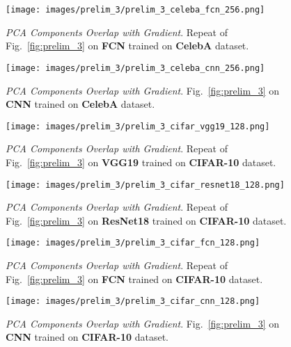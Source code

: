\begin{figure}[h!]
  \centering
  \centerline{\texttt{[image: images/prelim\_3/prelim\_3\_celeba\_fcn\_256.png]}}
  \caption{\small{\textit{PCA Components Overlap with Gradient}. Repeat of Fig.~\ref{fig:prelim_3} on \textbf{FCN} trained on \textbf{CelebA} dataset.}}
  \label{fig:prelim_3_celeba_fcn}
\end{figure}

\begin{figure}[h!]
  \centering
  \centerline{\texttt{[image: images/prelim\_3/prelim\_3\_celeba\_cnn\_256.png]}}
  \caption{\small{\textit{PCA Components Overlap with Gradient}. Fig.~\ref{fig:prelim_3} on \textbf{CNN} trained on \textbf{CelebA} dataset.}}
  \label{fig:prelim_3_celeba_cnn}
\end{figure}



\begin{figure}[h!]
  \centering
  \centerline{\texttt{[image: images/prelim\_3/prelim\_3\_cifar\_vgg19\_128.png]}}
  \caption{\small{\textit{PCA Components Overlap with Gradient}. Repeat of Fig.~\ref{fig:prelim_3} on \textbf{VGG19} trained on \textbf{CIFAR-10} dataset.}}
  \label{fig:prelim_3_cifar_vgg19}
\end{figure}

\begin{figure}[h!]
  \centering
  \centerline{\texttt{[image: images/prelim\_3/prelim\_3\_cifar\_resnet18\_128.png]}}
  \caption{\small{\textit{PCA Components Overlap with Gradient}. Repeat of Fig.~\ref{fig:prelim_3} on \textbf{ResNet18} trained on \textbf{CIFAR-10} dataset.}}
  \label{fig:prelim_3_cifar_resnet18}
\end{figure}

\begin{figure}[h!]
  \centering
  \centerline{\texttt{[image: images/prelim\_3/prelim\_3\_cifar\_fcn\_128.png]}}
  \caption{\small{\textit{PCA Components Overlap with Gradient}. Repeat of Fig.~\ref{fig:prelim_3} on \textbf{FCN} trained on \textbf{CIFAR-10} dataset.}}
  \label{fig:prelim_3_cifar_fcn}
\end{figure}

\begin{figure}[h!]
  \centering
  \centerline{\texttt{[image: images/prelim\_3/prelim\_3\_cifar\_cnn\_128.png]}}
  \caption{\small{\textit{PCA Components Overlap with Gradient}. Fig.~\ref{fig:prelim_3} on \textbf{CNN} trained on \textbf{CIFAR-10} dataset.}}
  \label{fig:prelim_3_cifar_cnn}
\end{figure}

